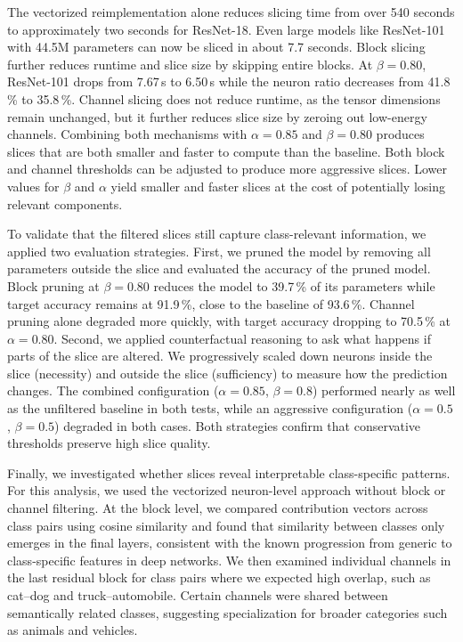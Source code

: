\documentclass[
12pt,
fancyheadings,
a4paper,
twoside,
BCOR=0.7cm,
nobcorignoretitle,
grayscalebody,
]{stsreprt}
\begin{document}
The vectorized reimplementation alone reduces slicing time from over 540 seconds to approximately
two seconds for ResNet-18.
Even large models like ResNet-101 with 44.5M parameters can now be sliced in about 7.7 seconds.
Block slicing further reduces runtime and slice size by skipping entire blocks. At $\beta = 0.80$,
ResNet-101 drops from 7.67\,s to 6.50\,s while the neuron ratio decreases from 41.8\,\% to
35.8\,\%.
Channel slicing does not reduce runtime, as the tensor dimensions remain unchanged, but it further
reduces slice size by zeroing out low-energy channels.
Combining both mechanisms with $\alpha = 0.85$ and $\beta = 0.80$ produces slices that are both
smaller and faster to compute than the baseline.
Both block and channel thresholds can be adjusted to produce more aggressive slices. Lower values
for $\beta$ and $\alpha$ yield smaller and faster slices at the cost of potentially losing relevant
components.

To validate that the filtered slices still capture class-relevant information, we applied two
evaluation strategies.
First, we pruned the model by removing all parameters outside the slice and evaluated the accuracy
of the pruned model.
Block pruning at $\beta = 0.80$ reduces the model to 39.7\,\% of its parameters while target
accuracy remains at 91.9\,\%, close to the baseline of 93.6\,\%.
Channel pruning alone degraded more quickly, with target accuracy dropping to 70.5\,\% at $\alpha =
0.80$.
Second, we applied counterfactual reasoning to ask what happens if parts of the slice are altered.
We progressively scaled down neurons inside the slice (necessity) and outside the slice
(sufficiency) to measure how the prediction changes.
The combined configuration ($\alpha{=}0.85$, $\beta{=}0.8$) performed nearly as well as the
unfiltered baseline in both tests, while an aggressive configuration ($\alpha{=}0.5$,
$\beta{=}0.5$) degraded in both cases.
Both strategies confirm that conservative thresholds preserve high slice quality.

Finally, we investigated whether slices reveal interpretable class-specific patterns.
For this analysis, we used the vectorized neuron-level approach without block or channel filtering.
At the block level, we compared contribution vectors across class pairs using cosine similarity and
found that similarity between classes only emerges in the final layers, consistent with the known
progression from generic to class-specific features in deep networks.
We then examined individual channels in the last residual block for class pairs where we expected
high overlap, such as cat--dog and truck--automobile.
Certain channels were shared between semantically related classes, suggesting specialization for
broader categories such as animals and vehicles.
\end{document}
